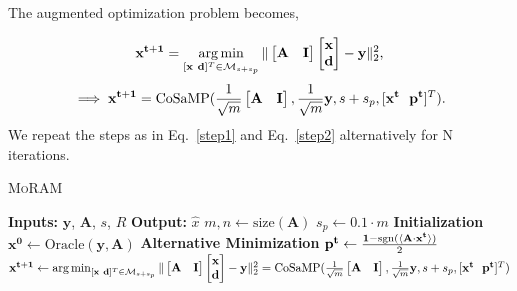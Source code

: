  The augmented optimization problem becomes,
  
$$
\mathbf{{x}^{t+1}}=\argmin_{[\mathbf{x~d}]^T \in \mathcal{M}_{s+s_p}}\norm{\begin{bmatrix} \mathbf{A} & \mathbf{I} \end{bmatrix} \begin{bmatrix} \mathbf{x} \\ \mathbf{d} \end{bmatrix} - \mathbf{y}}_2^2, %
$$
\begin{equation}
\implies \mathbf{{x^{t+1}}} = \mathrm{CoSaMP}(\frac{1}{\sqrt{m}}\begin{bmatrix} \mathbf{A} & \mathbf{I} \end{bmatrix},\frac{1}{\sqrt{m}}\mathbf{y},s+s_p,[\mathbf{x^t~~p^t}]^T).
\label{step2}
\end{equation}
We repeat the steps as in Eq.~\ref{step1} and Eq.~\ref{step2} alternatively for $\mathrm{N}$ iterations. 


%
\begin{algorithm}[t]
	\caption{\textsc{MoRAM}}
	\label{alg:DMF}
	\begin{algorithmic}
		\State\textbf{Inputs:} $\mathbf{y}$, $\mathbf{A}$, $s$, $R$
		\State\textbf{Output:}  $\widehat{x}$
		\State $m,n \leftarrow \mathrm{size}(\mathbf{A})$ 
		\State $s_p \leftarrow 0.1\cdot m$
		\State \textbf{Initialization}
		\State $\mathbf{x^0} \leftarrow \textrm{Oracle}(\mathbf{y, A})$ 
		\State \textbf{Alternative Minimization}
		\State $\mathbf{{p}^{t}} \leftarrow \frac{\mathbf{1}-\mathrm{sgn}(\langle \mathbf{A} \cdot \mathbf{x^t} \rangle)}{2}$
		\State $\mathbf{{x}^{t+1}}\leftarrow \operatorname*{arg\,min}_{[\mathbf{x~d}]^T \in \mathcal{M}_{s+s_p}}\|\begin{bmatrix} \mathbf{A} & \mathbf{I} \end{bmatrix} \begin{bmatrix} \mathbf{x} \\ \mathbf{d} \end{bmatrix} - \mathbf{y}\|_2^2 = \mathrm{CoSaMP}(\frac{1}{\sqrt{m}}\begin{bmatrix} \mathbf{A} & \mathbf{I} \end{bmatrix},\frac{1}{\sqrt{m}}\mathbf{y},s+s_p,[\mathbf{x^t~~p^t}]^T)$
		\EndFor
	\end{algorithmic}
\end{algorithm}



